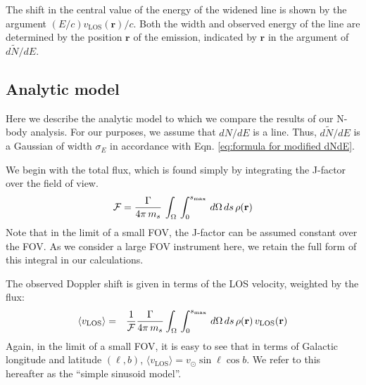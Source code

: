 \documentclass[aps,prd,10pt,twocolumn,superscriptaddress,showpacs]{revtex4-1}
\newcommand{\br}[0]{\mathbf{r}}
\newcommand{\los}[0]{\mathrm{LOS}}
\begin{document}
The shift in the central value of the energy of the widened line is shown by the argument $(E/c)
v_\los(\br)/c $.  Both the width and observed energy of the line are determined by the position
$\br$ of the emission, indicated by $\br$ in the argument of $d\tilde{N}/dE$.

\subsection{Analytic model}
\label{sec:simulations}



Here we describe the analytic model to which we compare the results of our N-body analysis.
For our purposes, we assume that $dN/dE$ is a line. Thus, $d\tilde{N}/dE$ is a Gaussian of width $\sigma_E$
in accordance with Eqn. \eqref{eq:formula for modified dNdE}.

We begin with the total flux, which is found simply by integrating the J-factor over the field of
view. 
\begin{eqnarray}
\mathcal{F} =  \frac{\Gamma}{4\pi \, m_s} \, \int _\Omega \, \int _0 ^{s_{\rm max}}  \,  d\Omega\,ds
\, \rho(\br) 
\label{eq:lineflux}
\end{eqnarray}
Note that in the limit of a small FOV, the J-factor can be assumed constant over the FOV. As we
consider a large FOV instrument here, we retain the full form of this integral in our calculations.

The observed Doppler shift is given in terms of the LOS velocity, weighted by the flux:
\begin{eqnarray}
	\langle v_\los\rangle &=& \frac{1}{\mathcal{F}}\frac{\Gamma}{4\pi \, m_s} 
	\int _\Omega \, \int _0 ^{s_{\rm max}}  \, d\Omega\,ds \, \rho(\br) \, v_\los(\br) 
\label{eq:lineshift}
\end{eqnarray}
Again, in the limit of a small FOV, it is easy to see that in terms of Galactic longitude and
latitude $(\ell, b)$, $\langle v_\los\rangle = v_\odot \sin \ell\cos b$. We refer to this hereafter
as the ``simple sinusoid model''. 
\end{document}
